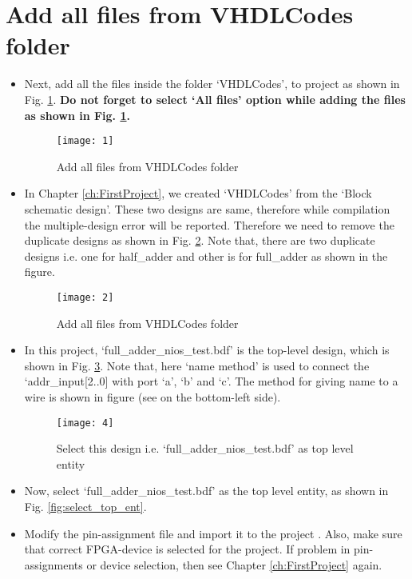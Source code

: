 \section{Add all files from VHDLCodes folder}

\begin{itemize}
	\item Next, add all the files inside the folder `VHDLCodes', to project as shown in Fig. \ref{fig:add_all_VHDLCodes}. \textbf{Do not forget to select `All files' option while adding the files as shown in Fig. \ref{fig:add_all_VHDLCodes}. } 
	
	\begin{figure}[!h]
		\centering
		\texttt{[image: 1]}
		\caption{Add all files from VHDLCodes folder}
		\label{fig:add_all_VHDLCodes}
	\end{figure}
		
	\item In Chapter \ref{ch:FirstProject}, we created  `VHDLCodes' from the `Block schematic design'. These two designs are same, therefore while compilation the multiple-design error will be reported. Therefore we need to remove the duplicate designs as shown in Fig. \ref{fig:remove_duplicate}.  Note that, there are two duplicate designs i.e. one for half\_adder and other is for full\_adder as shown in the figure. 
	\begin{figure}[!h]
		\centering
		\texttt{[image: 2]}
		\caption{Add all files from VHDLCodes folder}
		\label{fig:remove_duplicate}
	\end{figure}

	
	\item In this project, `full\_adder\_nios\_test.bdf' is the top-level design, which is shown in Fig. \ref{fig:full_adder_top_d}. Note that, here `name method' is used to connect the `addr\_input[2..0] with port `a', `b' and `c'. The method for giving name to a wire is shown in figure (see on the bottom-left side). 
	
	\begin{figure}[!h]
		\centering
		\texttt{[image: 4]}
		\caption{Select this design i.e. `full\_adder\_nios\_test.bdf' as top level entity}
		\label{fig:full_adder_top_d}
	\end{figure}
	
	\item Now, select `full\_adder\_nios\_test.bdf' as the top level entity, as shown in Fig. \ref{fig:select_top_ent}.
	
	\item Modify the pin-assignment file and import it to the project . Also, make sure that correct FPGA-device is selected for the project. If problem in pin-assignments or device selection, then see Chapter \ref{ch:FirstProject} again. 
\end{itemize}



